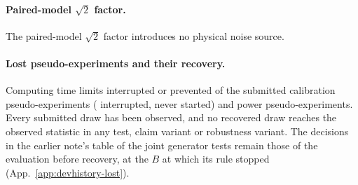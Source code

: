 \paragraph{Paired-model $\sqrt{2}$ factor.} The paired-model $\sqrt2$ factor introduces no physical noise source.

\paragraph{Lost pseudo-experiments and their recovery.} Computing time limits interrupted or prevented \jtLostCal{} of the submitted calibration pseudo-experiments (\jtLostInterrupted{} interrupted, \jtLostNever{} never started) and \jtLostPow{} power pseudo-experiments. Every submitted draw has been observed, and no recovered draw reaches the observed statistic in any test, claim variant or robustness variant. The decisions in the earlier note's table of the joint generator tests remain those of the evaluation before recovery, at the $B$ at which its rule stopped (App.~\ref{app:devhistory-lost}).

